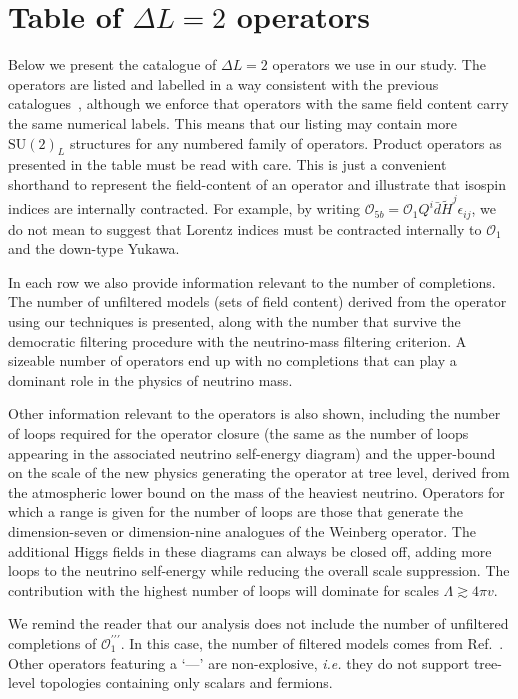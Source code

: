 
\chapter{Table of $\Delta L = 2$ operators}
\label{chapter:operator-table}

Below we present the catalogue of $\Delta L = 2$ operators we use in our study.
The operators are listed and labelled in a way consistent with the previous
catalogues~\cite{Babu:2001ex,deGouvea:2007qla}, although we enforce that
operators with the same field content carry the same numerical labels. This
means that our listing may contain more $\mathrm{SU}(2)_{L}$ structures for any
numbered family of operators. Product operators as presented in the table must
be read with care. This is just a convenient shorthand to represent the
field-content of an operator and illustrate that isospin indices are internally
contracted. For example, by writing
$\mathcal{O}_{5b} = \mathcal{O}_{1} Q^{i} \bar{d} \tilde{H}^{j} \epsilon_{ij}$,
we do not mean to suggest that Lorentz indices must be contracted internally to
$\mathcal{O}_{1}$ and the down-type Yukawa.

In each row we also provide information relevant to the number of completions.
The number of unfiltered models (sets of field content) derived from the
operator using our techniques is presented, along with the number that survive
the democratic filtering procedure with the neutrino-mass filtering criterion. A
sizeable number of operators end up with no completions that can play a dominant
role in the physics of neutrino mass.

Other information relevant to the operators is also shown, including the number
of loops required for the operator closure (the same as the number of loops
appearing in the associated neutrino self-energy diagram) and the upper-bound on
the scale of the new physics generating the operator at tree level, derived from
the atmospheric lower bound on the mass of the heaviest neutrino. Operators for
which a range is given for the number of loops are those that generate the
dimension-seven or dimension-nine analogues of the Weinberg operator. The
additional Higgs fields in these diagrams can always be closed off, adding more
loops to the neutrino self-energy while reducing the overall scale suppression.
The contribution with the highest number of loops will dominate for scales
$\Lambda \gtrsim 4\pi v$.

We remind the reader that our analysis does not include the number of unfiltered
completions of $\mathcal{O}_{1}^{\prime\prime\prime}$. In this case, the number
of filtered models comes from Ref.~\cite{Anamiati:2018cuq}. Other operators
featuring a `---' are non-explosive, \textit{i.e.} they do not support
tree-level topologies containing only scalars and fermions.

